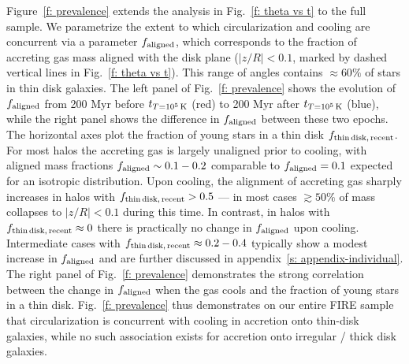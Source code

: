 \documentclass[fleqn,usenatbib]{mnras}
\newcommand{\tcon}{t_{T=10^5\,{\rm K}}}
\begin{document}
Figure~\ref{f: prevalence} extends the analysis in Fig.~\ref{f: theta vs t} to the full sample. We parametrize the extent to which circularization and cooling are concurrent via a parameter $f_{\rm aligned}$, which corresponds to the fraction of accreting gas mass aligned with the disk plane ($\vert z/R \vert < 0.1$, marked by dashed vertical lines in Fig.~\ref{f: theta vs t}). This range of angles contains $\approx 60\%$ of stars in thin disk galaxies.
The left panel of Fig.~\ref{f: prevalence} shows the evolution of $f_{\rm aligned}$ from 200 Myr before $\tcon$ (red) to 200 Myr after $\tcon$ (blue), while the right panel shows the difference in $f_{\rm aligned}$ between these two epochs. The horizontal axes plot the fraction of young stars in a thin disk $f_{\rm thin\,disk,\,recent}$. 
For most halos the accreting gas is largely unaligned prior to cooling, with aligned mass fractions $f_{\rm aligned}\sim 0.1 - 0.2$ comparable to $f_{\rm aligned} = 0.1$ expected for an isotropic distribution.
Upon cooling, the alignment of accreting gas sharply increases in halos with $f_{\rm thin\,disk,\,recent} > 0.5$ --- in most cases $\gtrsim 50\%$ of mass collapses to $\vert z/R \vert < 0.1$ during this time. In contrast, in halos with $f_{\rm thin\,disk,\,recent} \approx 0$ there is practically no change in $f_{\rm aligned}$ upon cooling. Intermediate cases with $f_{\rm thin\,disk,\,recent} \approx 0.2-0.4$ typically show a modest increase in $f_{\rm aligned}$ and are further discussed in appendix~\ref{s: appendix-individual}. The right panel of Fig.~\ref{f: prevalence} demonstrates the strong correlation between the change in $f_{\rm aligned}$ when the gas cools and the fraction of young stars in a thin disk. 
Fig.~\ref{f: prevalence} thus demonstrates on our entire FIRE sample that circularization is concurrent with cooling in accretion onto thin-disk galaxies, while no such association exists for accretion onto irregular / thick disk galaxies.
\end{document}
